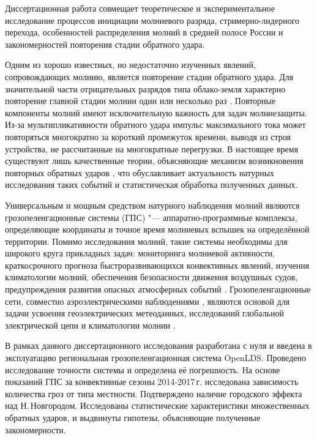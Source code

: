 
{\actuality} 
Диссертационная работа совмещает теоретическое и экспериментальное исследование процессов инициации молниевого разряда, стримерно-лидерного перехода, особенностей распределения молний в средней полосе России и закономерностей повторения стадии обратного удара.

Одним из хорошо известных, но недостаточно изученных явлений, сопровождающих молнию, является повторение стадии обратного удара. Для значительной части отрицательных разрядов типа облако-земля характерно повторение главной стадии молнии один или несколько раз \autocite{Rakov-PhysicsOfLightning}. Повторные компоненты молний имеют исключительную важность для задач молниезащиты. Из-за мультипликативности обратного удара импульс максимального тока может повторяться многократно за короткий промежуток времени, выводя из строя устройства, не рассчитанные на многократные перегрузки. В настоящее время существуют лишь качественные теории, объясняющие механизм возникновения повторных обратных ударов \autocite{RakovUman2005}, что обуславливает актуальность натурных исследования таких событий и статистическая обработка полученных данных.

Универсальным и мощным средством натурного наблюдения молний являются грозопеленгационные системы (ГПС) "--- аппаратно-программные комплексы, определяющие координаты и точное время молниевых вспышек на определённой территории. Помимо исследования молний, такие системы необходимы для широкого круга прикладных задач: мониторинга молниевой активности, краткосрочного прогноза быстроразвивающихся конвективных явлений, изучения климатологии молний, обеспечения безопасности движения воздушных судов, предупреждения развития опасных атмосферных событий \autocite{Matveev1984}. Грозопеленгационные сети, совместно аэроэлектрическими наблюдениями \autocite{Anisimov2013}, являются основой для задачи усвоения геоэлектрических метеоданных, исследований глобальной электрической цепи и климатологии молнии \autocite{Mareev2010,Williams2014}.

В рамках данного диссертационного исследования разработана с нуля и введена в эксплуатацию региональная грозопеленгационная система OpenLDS. Проведено исследование точности системы и определена её погрешность. На основе показаний ГПС за конвективные сезоны 2014-2017\,г. исследована зависимость количества гроз от типа местности. Подтверждено наличие городского эффекта над Н.\,Новгородом. Исследованы статистические характеристики множественных обратных ударов, и выдвинуты гипотезы, объясняющие полученные закономерности.

